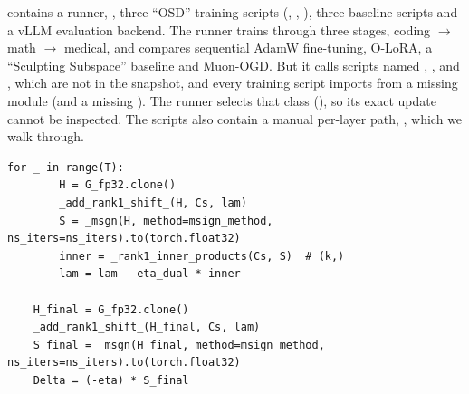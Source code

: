 \begin{implnote}[title={In the code: what is in the snapshot}]
 contains a runner, , three ``OSD'' training scripts
(, , ),
three baseline scripts and a vLLM evaluation backend. The runner trains
 through three stages, coding $\to$ math $\to$ medical, and
compares sequential AdamW fine-tuning, O-LoRA, a ``Sculpting Subspace'' baseline and Muon-OGD.
But it calls scripts named ,
,  and , which are not
in the snapshot, and every training script imports  from a missing module
 (and a missing ). The runner selects that class
(), so its exact update cannot be inspected. The scripts also
contain a manual per-layer path, , which we walk through.
\end{implnote}

\begin{lstlisting}[caption={Excerpt from \texttt{repos/\allowbreak jeremylu916\_\_OSD/\allowbreak train\_math\_OSD.py} (\texttt{\_muon\_ogd\_apply\_on\_weight\_factorized}): dual ascent of \cref{eq:c11-mo-ascent} with rank-one constraints},label={lst:c11-osd-dual}]
    for _ in range(T):
        H = G_fp32.clone()
        _add_rank1_shift_(H, Cs, lam)
        S = _msgn(H, method=msign_method, ns_iters=ns_iters).to(torch.float32)
        inner = _rank1_inner_products(Cs, S)  # (k,)
        lam = lam - eta_dual * inner

    H_final = G_fp32.clone()
    _add_rank1_shift_(H_final, Cs, lam)
    S_final = _msgn(H_final, method=msign_method, ns_iters=ns_iters).to(torch.float32)
    Delta = (-eta) * S_final
\end{lstlisting}

